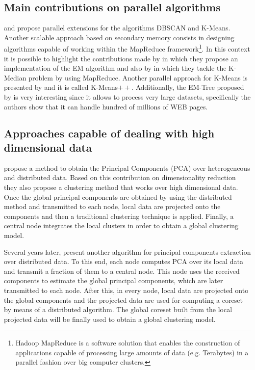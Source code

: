 \documentclass[a4paper]{article}
\begin{document}
\subsection{Main contributions on parallel algorithms}
\cite{XJK99} and \cite{DM99} propose parallel extensions for the algorithms DBSCAN and K-Means. Another scalable approach based on secondary memory consists in designing algorithms capable of working within the MapReduce framework\footnote{Hadoop MapReduce is a software solution that enables the construction of applications capable of processing large amounts of data (e.g. Terabytes) in a parallel fashion over big computer clusters.}. In this context it is possible to highlight the contributions made by \cite{DDGR07} in which they propose an implementation of the EM algorithm and also by \cite{EIM11} in which they tackle the K-Median problem by using MapReduce. Another parallel approach for K-Means is presented by \cite{BMVKV12} and it is called K-Means$++$. Additionally, the EM-Tree proposed by \cite{VVGN15} is very interesting since it allows to process very large datasets, specifically the authors show that it can handle hundred of millions of WEB pages.

\subsection{Approaches capable of dealing with high dimensional data} 
\cite{KHSJ01} propose a method to obtain the Principal Components (PCA) over heterogeneous and distributed data. Based on this contribution on dimensionality reduction they also propose a clustering method that works over high dimensional data. Once the global principal components are obtained by using the distributed method and transmitted to each node, local data are projected onto the components and then a traditional clustering technique is applied. Finally, a central node integrates the local clusters in order to obtain a global clustering model.

Several years later, \cite{LBK13} present another algorithm for principal components extraction over distributed data. To this end, each node computes PCA over its local data and transmit a fraction of them to a central node. This node uses the received components to estimate the global principal components, which are later transmitted to each node. After this, in every node, local data are projected onto the global components and the projected data are used for computing a coreset by means of a distributed algorithm. The global coreset built from the local projected data will be finally used to obtain a global clustering model.  
\end{document}
